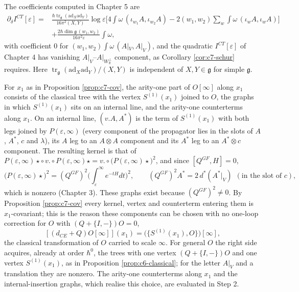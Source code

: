 The coefficients computed in Chapter 5 are
\[
\begin{aligned}
\partial_\delta I^{CT}[\varepsilon]={}&\frac{\hbar\operatorname{tr}_{\mathfrak g}(\mathrm{ad}_X\mathrm{ad}_Y)}{16\pi^2(X,Y)}\log\varepsilon\Big[4\int\omega\,(\iota_{w_1}A,\iota_{w_2}A)-2(w_1,w_2)\sum_w\int\omega\,(\iota_wA,\iota_wA)\Big]\\
&+\frac{2\hbar\dim\mathfrak g\,(w_1,w_2)}{16\pi^2\varepsilon}\int\omega ,
\end{aligned}
\]
with coefficient $0$ for $(w_1,w_2)\int\omega\,(A|_V,A|_V)$, and the quadratic $I^{CT}[\varepsilon]$ of Chapter 4 has vanishing $A|_V$--$A|_{W_{\mathbb R}^\perp}$ component, as Corollary \ref{cor:c7-schur} requires. Here $\operatorname{tr}_{\mathfrak g}(\mathrm{ad}_X\mathrm{ad}_Y)/(X,Y)$ is independent of $X,Y\in\mathfrak g$ for simple $\mathfrak g$.

\begin{remark}
\label{rem:c7-internal}
For $x_1$ as in Proposition \ref{prop:c7-cov}, the arity-one part of $O[\infty]$ along $x_1$ consists of the classical tree with the vertex $S^{(1)}(x_1)$ joined to $O$, the graphs in which $S^{(1)}(x_1)$ sits on an internal line, and the arity-one counterterms along $x_1$. On an internal line, $(v.A,A^*)$ is the term of $S^{(1)}(x_1)$ with both legs joined by $P(\varepsilon,\infty)$ (every component of the propagator lies in the slots of $A$, $A^*$, $c$ and $\lambda$), its $A$ leg to an $A\otimes A$ component and its $A^*$ leg to an $A^*\otimes c$ component. The resulting kernel is that of $P(\varepsilon,\infty)\star\circ\,v.\circ P(\varepsilon,\infty)\star=v.\circ\big(P(\varepsilon,\infty)\star\big)^2$, and since $[Q^{GF},H]=0$,
\[
\big(P(\varepsilon,\infty)\star\big)^2=(Q^{GF})^2\Big(\int_\varepsilon^\infty e^{-tH}dt\Big)^2,\qquad (Q^{GF})^2A^*=2\,d^*(A^*|_V)\ \ (\text{in the slot of }c),
\]
which is nonzero (Chapter 3). These graphs exist because $(Q^{GF})^2\neq0$. By Proposition \ref{prop:c7-cov} every kernel, vertex and counterterm entering them is $x_1$-covariant; this is the reason these components can be chosen with no one-loop correction for $O$ with $(Q+\{I,-\})O=0$,
\[
[(d_{CE}+Q)O[\infty]](x_1)=\big(\{S^{(1)}(x_1),O\}\big)[\infty],
\]
the classical transformation of $O$ carried to scale $\infty$. For general $O$ the right side acquires, already at order $\hbar^0$, the trees with one vertex $(Q+\{I,-\})O$ and one vertex $S^{(1)}(x_1)$, as in Proposition \ref{prop:c6-classical}; for the letter $A|_V$ and a translation they are nonzero. The arity-one counterterms along $x_1$ and the internal-insertion graphs, which realise this choice, are evaluated in Step 2.
\end{remark}

